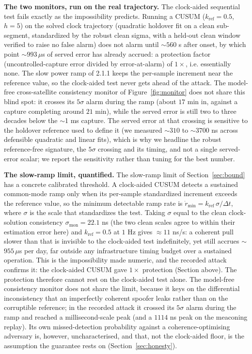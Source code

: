 \documentclass[conference]{IEEEtran}
\begin{document}
\textbf{The two monitors, run on the real trajectory.} The clock-aided sequential
test fails exactly as the impossibility predicts. Running a CUSUM
($k_{\mathrm{ref}}=0.5$, $h=5$) on the solved clock trajectory (quadratic holdover
fit on a clean sub-segment, standardized by the robust clean sigma, with a held-out
clean window verified to raise no false alarm) does not alarm until $\sim$$560$ s
after onset, by which point $\sim$$993\,\mu$s of served error has already accrued:
a protection factor (uncontrolled-capture error divided by error-at-alarm) of
$1\times$, i.e. essentially none. The slow power ramp of
2.1.1 keeps the per-sample increment near the reference value, so the clock-aided
test never gets ahead of the attack. The model-free cross-satellite consistency
monitor of Figure~\ref{fig:monitor} does not share this blind spot: it crosses its
$5\sigma$ alarm during the ramp (about $17$ min in, against a capture completing
around $21$ min), while the served error is still two to three decades below the
$\sim$1 ms capture. The served error at that crossing is sensitive to the holdover
reference used to define it (we measured $\sim$$310$ to $\sim$$3700$ ns across
defensible quadratic and linear fits), which is why we headline the robust
reference-free signature, the $5\sigma$ crossing and its timing, and not a single
served-error scalar; we report the sensitivity rather than tuning for the best
number.

\textbf{The slow-ramp limit, quantified.} The slow-ramp limit of
Section~\ref{sec:bound} has a concrete calibrated threshold. A clock-aided CUSUM
detects a sustained common-mode ramp only when its per-sample standardized
increment exceeds the reference value, so the minimum detectable ramp rate is
$\dot r_{\min} = k_{\mathrm{ref}}\,\sigma/\Delta t$, where $\sigma$ is the scale that
standardizes the test. Taking $\sigma$ equal to the clean clock-solution consistency
$\sigma_{\mathrm{mon}}=22.1$ ns (the two clean scales agree to within their
estimation error here) and $k_{\mathrm{ref}}=0.5$ at $1$ Hz gives
$\approx 11$ ns/s: a coherent pull slower than that is invisible to the
clock-aided test indefinitely, yet still accrues $\sim$$955\,\mu$s per day, far
outside any infrastructure timing budget over a sustained operation. This is the
impossibility made numeric, and the recorded attack confirms it: the clock-aided
CUSUM gave $1\times$ protection (Section above). The protection therefore cannot
rest on the clock-aided test alone. The model-free consistency monitor does not
share the limit, because it keys on the differential inconsistency that an
imperfectly coherent spoofer leaks rather than on the corruptible reference; in the
recorded attack it crossed its $5\sigma$ alarm during the ramp and reached a
millisecond-scale peak (and a $1114$ ns peak on the meaconing replay). Its own
missed-detection probability against a coherence-optimising adversary is, however,
uncharacterised, and that, not the clock-aided floor, is the assumption the
guarantee rests on (Section~\ref{sec:honesty}).
\end{document}
